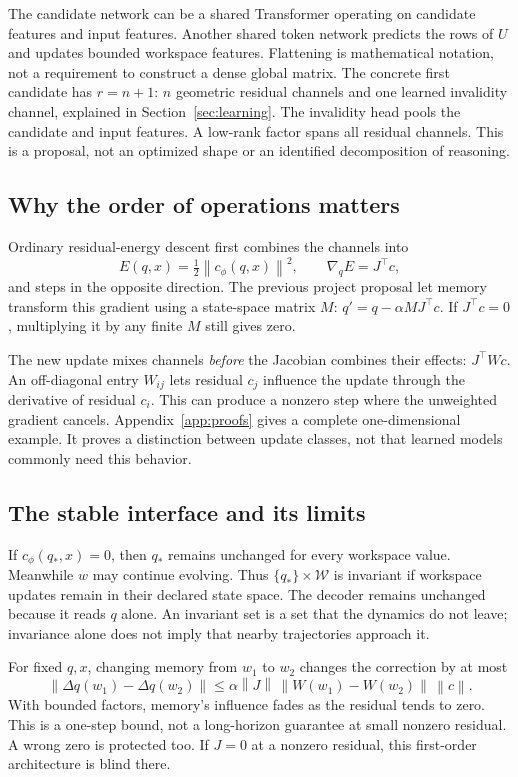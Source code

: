 \documentclass[11pt,a4paper]{article}
\newcommand{\norm}[1]{\left\lVert #1\right\rVert}
\begin{document}
The candidate network can be a shared Transformer operating on candidate features and input features. Another shared token network predicts the rows of $U$ and updates bounded workspace features. Flattening is mathematical notation, not a requirement to construct a dense global matrix. The concrete first candidate has $r=n+1$: $n$ geometric residual channels and one learned invalidity channel, explained in Section~\ref{sec:learning}. The invalidity head pools the candidate and input features. A low-rank factor spans all residual channels. This is a proposal, not an optimized shape or an identified decomposition of reasoning.

\subsection{Why the order of operations matters}
Ordinary residual-energy descent first combines the channels into
\[
E(q,x)=\tfrac12\norm{c_\phi(q,x)}^2,
\qquad \nabla_q E=J^\top c,
\]
and steps in the opposite direction. The previous project proposal let memory transform this gradient using a state-space matrix $M$: $q'=q-\alpha M J^\top c$. If $J^\top c=0$, multiplying it by any finite $M$ still gives zero.

The new update mixes channels \emph{before} the Jacobian combines their effects: $J^\top Wc$. An off-diagonal entry $W_{ij}$ lets residual $c_j$ influence the update through the derivative of residual $c_i$. This can produce a nonzero step where the unweighted gradient cancels. Appendix~\ref{app:proofs} gives a complete one-dimensional example. It proves a distinction between update classes, not that learned models commonly need this behavior.

\subsection{The stable interface and its limits}
If $c_\phi(q_*,x)=0$, then $q_*$ remains unchanged for every workspace value. Meanwhile $w$ may continue evolving. Thus $\{q_*\}\times\mathcal W$ is invariant if workspace updates remain in their declared state space. The decoder remains unchanged because it reads $q$ alone. An invariant set is a set that the dynamics do not leave; invariance alone does not imply that nearby trajectories approach it.

For fixed $q,x$, changing memory from $w_1$ to $w_2$ changes the correction by at most
\begin{equation}
\norm{\Delta q(w_1)-\Delta q(w_2)}
\le\alpha\norm{J}\,\norm{W(w_1)-W(w_2)}\,\norm{c}.\label{eq:memorybound}
\end{equation}
With bounded factors, memory's influence fades as the residual tends to zero. This is a one-step bound, not a long-horizon guarantee at small nonzero residual. A wrong zero is protected too. If $J=0$ at a nonzero residual, this first-order architecture is blind there.
\end{document}
